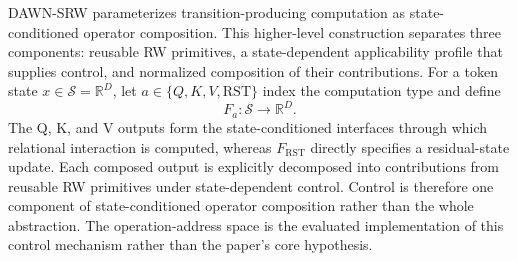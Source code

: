 \documentclass{article}
\newcommand{\R}{\mathbb{R}}
\newcommand{\DAWN}{DAWN-SRW}
\begin{document}
\DAWN{} parameterizes transition-producing computation as state-conditioned
operator composition. This higher-level construction separates three
components: reusable RW primitives, a state-dependent applicability profile
that supplies control, and normalized composition of their contributions. For
a token state \(x\in\mathcal{S}=\R^D\), let
\(a\in\{Q,K,V,\mathrm{RST}\}\) index the computation type and define
\begin{equation}
F_a:\mathcal{S}\rightarrow\R^D.
\label{eq:composed_output}
\end{equation}
The Q, K, and V outputs form the state-conditioned interfaces through which
relational interaction is computed, whereas \(F_{\mathrm{RST}}\) directly
specifies a residual-state update. Each composed output is explicitly
decomposed into contributions from reusable RW primitives under state-dependent
control. Control is therefore one component of state-conditioned operator
composition rather than the whole abstraction. The operation-address space is
the evaluated implementation of this control mechanism rather than the paper's
core hypothesis.
\end{document}
